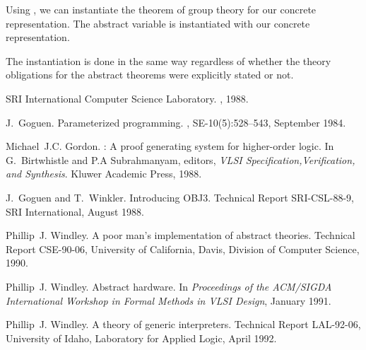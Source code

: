 Using {}, we can instantiate the theorem
of group theory for our concrete representation.  The abstract variable
{} is instantiated with our concrete representation.
\begin{boxed}\begin{hol}\begin{alltt}
\end{alltt}\end{hol}\end{boxed}
The instantiation is done in the same way regardless of whether the theory
obligations for the abstract theorems were explicitly stated or not. 


\begin{thebibliography}{EHD88}

SRI International Computer Science Laboratory.
, 1988.

J.~Goguen.
\newblock Parameterized programming.
, SE-10(5):528--543,
  September 1984.

Michael~J.C. Gordon.
: A proof generating system for higher-order logic.
\newblock In G.~Birtwhistle and P.A Subrahmanyam, editors, {\em {VLSI}
  Specification,Verification, and Synthesis}. Kluwer Academic Press, 1988.

J.~Goguen and T.~Winkler.
\newblock Introducing \mbox{OBJ3}.
\newblock Technical Report SRI-CSL-88-9, SRI International, August 1988.

Phillip~J. Windley.
\newblock A poor man's implementation of abstract theories.
\newblock Technical Report CSE-90-06, University of California, Davis, Division
  of Computer Science, 1990.

Phillip~J. Windley.
\newblock Abstract hardware.
\newblock In {\em Proceedings of the {ACM/SIGDA} International Workshop in
  Formal Methods in {VLSI} Design}, January 1991.

Phillip~J. Windley.
\newblock A theory of generic interpreters.
\newblock Technical Report LAL-92-06, University of Idaho, Laboratory for
  Applied Logic, April 1992.

\end{thebibliography}


